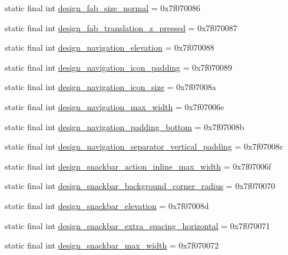 \begin{CompactItemize}
static final int \hyperlink{classcom_1_1companyname_1_1x__2doo_1_1_r_1_1dimen_88a64ec4020a7fd8f7fa26ca3b82ca50}{design\_\-fab\_\-size\_\-normal} = 0x7f070086
\item 
static final int \hyperlink{classcom_1_1companyname_1_1x__2doo_1_1_r_1_1dimen_ae707aed5caef15b311fdd297735b6ae}{design\_\-fab\_\-translation\_\-z\_\-pressed} = 0x7f070087
\item 
static final int \hyperlink{classcom_1_1companyname_1_1x__2doo_1_1_r_1_1dimen_a10b8fa843c9dd92f605ef879c3329e2}{design\_\-navigation\_\-elevation} = 0x7f070088
\item 
static final int \hyperlink{classcom_1_1companyname_1_1x__2doo_1_1_r_1_1dimen_54e7ad1060416c0a8fa81ea3b164e79a}{design\_\-navigation\_\-icon\_\-padding} = 0x7f070089
\item 
static final int \hyperlink{classcom_1_1companyname_1_1x__2doo_1_1_r_1_1dimen_20d1debd0e86ed82da7295a6e958e23d}{design\_\-navigation\_\-icon\_\-size} = 0x7f07008a
\item 
static final int \hyperlink{classcom_1_1companyname_1_1x__2doo_1_1_r_1_1dimen_17db522e96f0a15677faa96117d77d47}{design\_\-navigation\_\-max\_\-width} = 0x7f07006e
\item 
static final int \hyperlink{classcom_1_1companyname_1_1x__2doo_1_1_r_1_1dimen_3a5660e97fbff6ff1de4745118835108}{design\_\-navigation\_\-padding\_\-bottom} = 0x7f07008b
\item 
static final int \hyperlink{classcom_1_1companyname_1_1x__2doo_1_1_r_1_1dimen_fdba09c0b006c07718cbfcee3b9954e5}{design\_\-navigation\_\-separator\_\-vertical\_\-padding} = 0x7f07008c
\item 
static final int \hyperlink{classcom_1_1companyname_1_1x__2doo_1_1_r_1_1dimen_86ed76e4521f3a499393864b860c9102}{design\_\-snackbar\_\-action\_\-inline\_\-max\_\-width} = 0x7f07006f
\item 
static final int \hyperlink{classcom_1_1companyname_1_1x__2doo_1_1_r_1_1dimen_ff77041aa6899913dcce899499c7f9fb}{design\_\-snackbar\_\-background\_\-corner\_\-radius} = 0x7f070070
\item 
static final int \hyperlink{classcom_1_1companyname_1_1x__2doo_1_1_r_1_1dimen_7d31638dff79f2bca79343faa0c4ee8e}{design\_\-snackbar\_\-elevation} = 0x7f07008d
\item 
static final int \hyperlink{classcom_1_1companyname_1_1x__2doo_1_1_r_1_1dimen_d1263c753485bccf820c76b922735fc4}{design\_\-snackbar\_\-extra\_\-spacing\_\-horizontal} = 0x7f070071
\item 
static final int \hyperlink{classcom_1_1companyname_1_1x__2doo_1_1_r_1_1dimen_ea27df5095e8f3c1ab3f314e74b81868}{design\_\-snackbar\_\-max\_\-width} = 0x7f070072

\end{CompactItemize}
